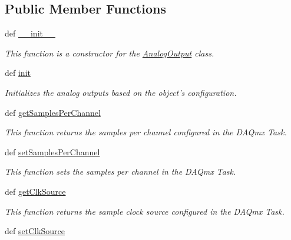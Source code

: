 \subsection*{Public Member Functions}
\begin{DoxyCompactItemize}
\item 
def \hyperlink{class_chassis_8git_1_1_analog_output_1_1_analog_output_acd0485666c89db7bf7d29c8358bfc8d2}{\-\_\-\-\_\-init\-\_\-\-\_\-}
\begin{DoxyCompactList}\small\item\em This function is a constructor for the \hyperlink{class_chassis_8git_1_1_analog_output_1_1_analog_output}{Analog\-Output} class. \end{DoxyCompactList}\item 
def \hyperlink{class_chassis_8git_1_1_analog_output_1_1_analog_output_a44f5dd6ea894853b77f6f18b3b03ca06}{init}
\begin{DoxyCompactList}\small\item\em Initializes the analog outputs based on the object's configuration. \end{DoxyCompactList}\item 
def \hyperlink{class_chassis_8git_1_1_analog_output_1_1_analog_output_a3bcdcfbda98a73ae82c9a30877ccb455}{get\-Samples\-Per\-Channel}
\begin{DoxyCompactList}\small\item\em This function returns the samples per channel configured in the D\-A\-Qmx Task. \end{DoxyCompactList}\item 
def \hyperlink{class_chassis_8git_1_1_analog_output_1_1_analog_output_acffabdf6defa7d994c363cb9cd83cb5b}{set\-Samples\-Per\-Channel}
\begin{DoxyCompactList}\small\item\em This function sets the samples per channel in the D\-A\-Qmx Task. \end{DoxyCompactList}\item 
def \hyperlink{class_chassis_8git_1_1_analog_output_1_1_analog_output_a1ba576d85e63c6c3aac5ad6fe899ee91}{get\-Clk\-Source}
\begin{DoxyCompactList}\small\item\em This function returns the sample clock source configured in the D\-A\-Qmx Task. \end{DoxyCompactList}\item 
def \hyperlink{class_chassis_8git_1_1_analog_output_1_1_analog_output_a67c1392eefe5fc6e243a0354f5c79c35}{set\-Clk\-Source}

\end{DoxyCompactItemize}

